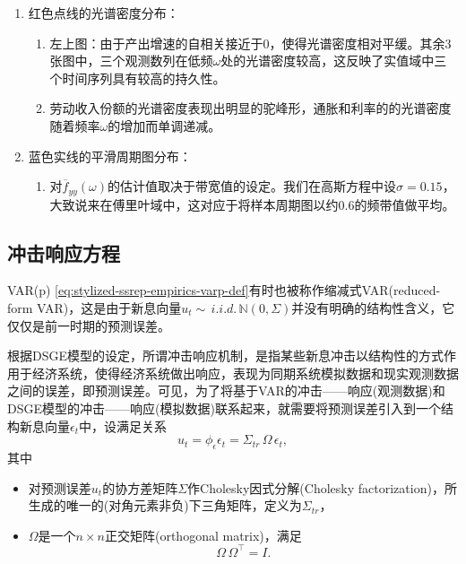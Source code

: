 \begin{enumerate}
  \item 红色点线的光谱密度分布：
\begin{enumerate}
  \item 左上图：由于产出增速的自相关接近于$0$，使得光谱密度相对平缓。其余3张图中，三个观测数列在低频$\omega$处的光谱密度较高，这反映了实值域中三个时间序列具有较高的持久性。
  \item 劳动收入份额的光谱密度表现出明显的驼峰形，通胀和利率的的光谱密度随着频率$\omega$的增加而单调递减。
\end{enumerate}
\item 蓝色实线的平滑周期图分布：
\begin{enumerate}
  \item 对$\overline{f}_{yy} \left( \omega \right)$的估计值取决于带宽值的设定。我们在高斯方程中设$\sigma = 0.15$，大致说来在傅里叶域中，这对应于将样本周期图以约0.6的频带值做平均。
  \end{enumerate}
\end{enumerate}

\subsection{冲击响应方程}
\label{sec:stylized-ssrep-empirics-irfs}

VAR(p) \eqref{eq:stylized-ssrep-empirics-varp-def}有时也被称作缩减式VAR(reduced-form VAR)，这是由于新息向量$u_{t} \sim \, i.i.d. \, \mathbb{N} \left( 0, \Sigma \right)$并没有明确的结构性含义，它仅仅是前一时期的预测误差。

根据DSGE模型的设定，所谓冲击响应机制，是指某些新息冲击以结构性的方式作用于经济系统，使得经济系统做出响应，表现为同期系统模拟数据和现实观测数据之间的误差，即预测误差。可见，为了将基于VAR的冲击——响应(观测数据)和DSGE模型的冲击——响应(模拟数据)联系起来，就需要将预测误差引入到一个结构新息向量$\epsilon_{t}$中，设满足关系
\begin{equation}
  \label{eq:stylized-ssrep-svar-forecast-error}
  u_{t} = \phi_{\epsilon} \epsilon_{t} = \Sigma_{tr} \, \Omega \, \epsilon_{t},
\end{equation}
其中
\begin{itemize}
\item 对预测误差$u_{t}$的协方差矩阵$\Sigma$作Cholesky因式分解(Cholesky factorization)，所生成的唯一的(对角元素非负)下三角矩阵，定义为$\Sigma_{tr}$，
\item $\Omega$是一个$n \times n$正交矩阵(orthogonal matrix)，满足
\begin{equation*}
  \Omega \, \Omega^{\top} = I.
\end{equation*}
\end{itemize}

